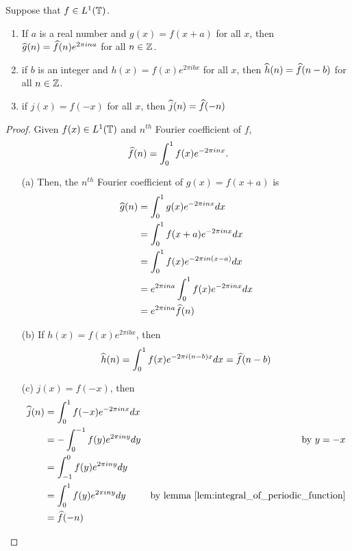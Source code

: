   \begin{proposition}
    \label{prop:properties_of_fourier_coefficients}
    Suppose that $f\in L^1(\mathbb T)$.
    \begin{enumerate}[label=(\alph*)]
      \item If $a$ is a real number and $g(x) = f(x+a)$ for all $x$, then $\widehat{g}(n) = \widehat{f}(n)e^{2\pi ina}$ for all $n \in \mathbb Z$.
      \item if $b$ is an integer and $h(x) = f(x)e^{2\pi i bx}$ for all $x$, then $\widehat{h}(n) = \widehat{f}(n-b)$ for all $n\in \mathbb Z$.
      \item if $j(x) = f(-x)$ for all $x$, then $\widehat{j}(n) = \widehat{f}(-n)$
    \end{enumerate}
  \end{proposition}
  \begin{proof}
     Given $f(x) \in L^1(\mathbb T)$ and $n^{th}$ Fourier coefficient of $f$,  
    \[\widehat{f}(n) = \int_{0}^{1}f(x)e^{-2 \pi inx}.\]
    \begin{enumerate}
      \item[(a)] Then, the $n^{th}$ Fourier coefficient of $g(x) = f(x+a)$ is
        \begin{align*}
          \widehat{g}(n) &= \int_{0}^{1}g(x)e^{-2\pi inx} dx \\
                &= \int_{0}^{1}f(x+a)e^{-2\pi inx} dx \\
                &= \int_{0}^{1}f(x)e^{-2\pi in(x-a)} dx \\
                &= e^{2\pi ina} \int_0^1 f(x)e^{-2\pi inx} dx \\
                &= e^{2\pi ina} \widehat{f}(n)
        \end{align*}

      \item[(b)] If $h(x) = f(x)e^{2\pi ibx}$, then
        \begin{displaymath}
          \widehat{h}(n) = \int_0^1 f(x)e^{-2 \pi i (n-b)x} dx = \widehat{f}(n-b)
        \end{displaymath}
      \item[(c)] $j(x) = f(-x)$, then
        \begin{align*}
          \widehat{j}(n)  &= \int_0^1 f(-x)e^{-2\pi inx} dx \\
                    &= -\int_0^{-1} f(y) e^{2\pi iny}dy & \text{by } y=-x\\
                    &= \int_{-1}^0 f(y)e^{2\pi iny}dy \\
                    &= \int_0^1 f(y)e^{2\pi iny}dy & \text{by lemma }\ref{lem:integral_of_periodic_function}\\
                    &= \widehat{f}(-n)
        \end{align*}
        
        
    \end{enumerate}
  \end{proof}


